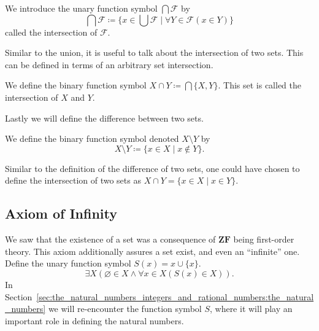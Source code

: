 \documentclass[../main.tex]{subfiles}
\begin{document}
\begin{definition}
    We introduce the unary function symbol $\bigcap\mathcal{F}$ by
    \begin{equation*}
        \bigcap\mathcal{F}\coloneq\{x\in\bigcup\mathcal{F}\mid\forall Y\in\mathcal{F}(x\in Y)\}
    \end{equation*}
    called the intersection of $\mathcal{F}$.
\end{definition}
Similar to the union, it is useful to talk about the intersection of two sets. This can be defined in terms of an arbitrary set intersection.
\begin{definition}
    We define the binary function symbol $X\cap Y\coloneq\bigcap\{X,Y\}$. This set is called the intersection of $X$ and $Y$.
\end{definition}
Lastly we will define the difference between two sets.
\begin{definition}
    We define the binary function symbol denoted $X\setminus Y$ by
    \begin{equation*}
        X\setminus Y\coloneq\{x\in X\mid x\notin Y\}.
    \end{equation*}
\end{definition}
Similar to the definition of the difference of two sets, one could have chosen to define the intersection of two sets as $X\cap Y=\{x\in X\mid x\in Y\}$.

\subsection*{Axiom of Infinity}\label{subsec:zermelo_fraenkel_set_theory:axiom_of_infinity}
We saw that the existence of a set was a consequence of $\mathbf{ZF}$ being first-order theory. This axiom additionally assures a set exist, and even an ``infinite'' one. Define the unary function symbol $S(x)=x\cup\{x\}$.
\begin{equation*}
    \exists X(\varnothing\in X\land\forall x\in X(S(x)\in X)).
\end{equation*}
In Section~\ref{sec:the_natural_numbers_integers_and_rational_numbers:the_natural_numbers} we will re-encounter the function symbol $S$, where it will play an important role in defining the natural numbers.
\end{document}
